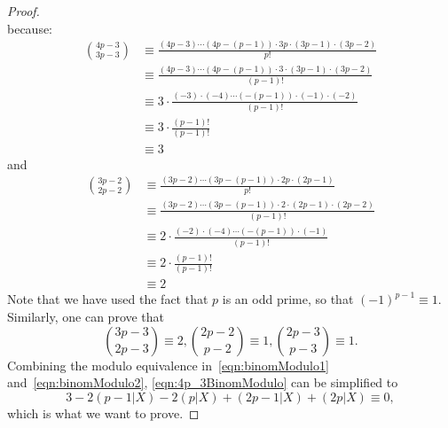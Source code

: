 \documentclass{article}
\theoremstyle{definition}
\numberwithin{equation}{theorem}
\numberwithin{figure}{theorem}
\newcommand{\numSumSubset}[2]{\ensuremath{(#1|#2)}}
\begin{document}
\begin{proof}
\begin{equation}
        \end{equation}
        because:
        \begin{align*}
            \binom{4p-3}{3p-3} &\equiv \frac{(4p-3) \cdots (4p-(p-1)) \cdot 3p \cdot (3p-1) \cdot (3p-2)}{p!}\\
            &\equiv \frac{(4p-3) \cdots (4p-(p-1)) \cdot 3 \cdot (3p-1) \cdot (3p-2)}{(p-1)!} \\
            &\equiv 3 \cdot \frac{(-3) \cdot (-4) \cdots (-(p-1)) \cdot(-1)\cdot(-2)}{(p-1)!}\\
            &\equiv 3 \cdot \frac{(p-1)!}{(p-1)!}\\
            &\equiv 3
        \end{align*}        
        and
        \begin{align*}
            \binom{3p-2}{2p-2} &\equiv \frac{(3p-2) \cdots (3p-(p-1)) \cdot 2p \cdot (2p-1)}{p!}\\
            &\equiv \frac{(3p-2) \cdots (3p-(p-1)) \cdot 2 \cdot (2p-1) \cdot (2p-2)}{(p-1)!} \\
            &\equiv 2 \cdot \frac{(-2) \cdot (-4) \cdots (-(p-1)) \cdot(-1)}{(p-1)!}\\
            &\equiv 2 \cdot \frac{(p-1)!}{(p-1)!}\\
            &\equiv 2
        \end{align*}
        Note that we have used the fact that $p$ is an odd prime, so that $(-1)^{p-1} \equiv 1$.
        Similarly, one can prove that
        \begin{equation}\label{eqn:binomModulo2}
            \binom{3p-3}{2p-3}\equiv 2, \binom{2p-2}{p-2} \equiv 1, \binom{2p-3}{p-3}\equiv 1.
        \end{equation}
        Combining the modulo equivalence in~\eqref{eqn:binomModulo1} and~\eqref{eqn:binomModulo2}, \eqref{eqn:4p_3BinomModulo} can be simplified to
        \begin{equation}
            3 - 2\numSumSubset{p-1}{X} - 2\numSumSubset{p}{X} + \numSumSubset{2p-1}{X} + \numSumSubset{2p}{X} \equiv 0, 
        \end{equation}
        which is what we want to prove.
        \end{proof}
\end{document}
